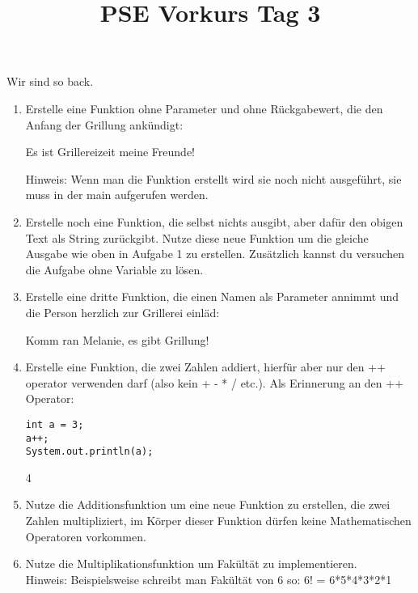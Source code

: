 \documentclass{../../sheet}
\title{PSE Vorkurs Tag 3}
\begin{document}
\maketitle
Wir sind so back.

\newpage


\begin{enumerate}
    \item Erstelle eine Funktion ohne Parameter und ohne Rückgabewert, die den Anfang der Grillung ankündigt:
    \begin{ausgabe}
Es ist Grillereizeit meine Freunde!
    \end{ausgabe}
    Hinweis: Wenn man die Funktion erstellt wird sie noch nicht ausgeführt, sie muss in der main aufgerufen werden.
    \item Erstelle noch eine Funktion, die selbst nichts ausgibt, aber dafür den obigen Text als String zurückgibt. Nutze diese neue Funktion um die gleiche Ausgabe wie oben in Aufgabe 1 zu erstellen. Zusätzlich kannst du versuchen die Aufgabe ohne Variable zu lösen.
    \item Erstelle eine dritte Funktion, die einen Namen als Parameter annimmt und die Person herzlich zur Grillerei einläd:
    \begin{ausgabe}
Komm ran Melanie, es gibt Grillung!
    \end{ausgabe}
    \item Erstelle eine Funktion, die zwei Zahlen addiert, hierfür aber nur den ++ operator verwenden darf (also kein + - * / etc.). Als Erinnerung an den ++ Operator:
    \begin{verbatim}
int a = 3;
a++;
System.out.println(a);
    \end{verbatim}
    \begin{ausgabe}
        4
    \end{ausgabe}
    \item Nutze die Additionsfunktion um eine neue Funktion zu erstellen, die zwei Zahlen multipliziert, im Körper dieser Funktion dürfen keine Mathematischen Operatoren vorkommen.
    \item Nutze die Multiplikationsfunktion um Fakültät zu implementieren.\\
    Hinweis: Beispielsweise schreibt man Fakültät von 6 so: 6! = 6*5*4*3*2*1
\end{enumerate}

\newpage
{}
\end{document}
